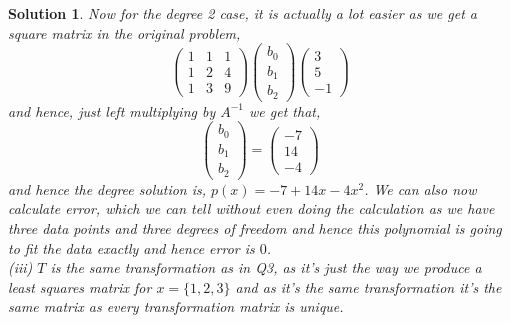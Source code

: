 \documentclass{article}
\newtheorem{solution}{Solution}
\begin{document}
\begin{solution}
  \noindent
  Now for the degree 2 case, it is actually a lot easier as we get a square matrix in the original problem,
  $$ \begin{pmatrix}
    1 & 1 & 1 \\
    1 & 2 & 4 \\
    1 & 3 & 9
  \end{pmatrix}\begin{pmatrix}
    b_0 \\ b_1 \\ b_2
  \end{pmatrix} \begin{pmatrix}
    3 \\ 5 \\ -1
  \end{pmatrix}$$
  and hence, just left multiplying by $A^{-1}$ we get that,
  $$ \begin{pmatrix}
    b_0 \\ b_1 \\ b_2
  \end{pmatrix} = \begin{pmatrix}
    -7 \\ 14 \\ -4
  \end{pmatrix}$$
  and hence the degree solution is, $p(x) = -7 + 14x - 4x^2$. We can also now calculate error, which we can tell without even doing the calculation as we have three data points and three degrees of freedom and hence this polynomial is going to fit the data exactly and hence error is $0$.\\

  \noindent
  (iii) \quad $T$ is the same transformation as in Q3, as it's just the way we produce a least squares matrix for $x = \{1, 2, 3\}$ and as it's the same transformation it's the same matrix as every transformation matrix is unique.
\end{solution}
\end{document}
